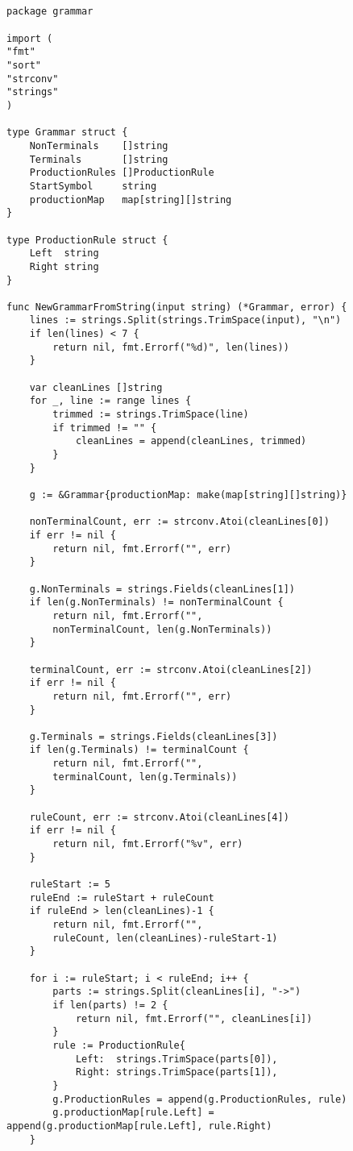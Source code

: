 \begin{appendices}
	\chapter{}\label{app1}
	\begin{lstlisting}[caption=Модуль grammar, extendedchars=\true]
package grammar

import (
"fmt"
"sort"
"strconv"
"strings"
)

type Grammar struct {
	NonTerminals    []string
	Terminals       []string
	ProductionRules []ProductionRule
	StartSymbol     string
	productionMap   map[string][]string
}

type ProductionRule struct {
	Left  string
	Right string
}

func NewGrammarFromString(input string) (*Grammar, error) {
	lines := strings.Split(strings.TrimSpace(input), "\n")
	if len(lines) < 7 {
		return nil, fmt.Errorf("%d)", len(lines))
	}
	
	var cleanLines []string
	for _, line := range lines {
		trimmed := strings.TrimSpace(line)
		if trimmed != "" {
			cleanLines = append(cleanLines, trimmed)
		}
	}
	
	g := &Grammar{productionMap: make(map[string][]string)}
	
	nonTerminalCount, err := strconv.Atoi(cleanLines[0])
	if err != nil {
		return nil, fmt.Errorf("", err)
	}
	
	g.NonTerminals = strings.Fields(cleanLines[1])
	if len(g.NonTerminals) != nonTerminalCount {
		return nil, fmt.Errorf("",
		nonTerminalCount, len(g.NonTerminals))
	}
	
	terminalCount, err := strconv.Atoi(cleanLines[2])
	if err != nil {
		return nil, fmt.Errorf("", err)
	}
	
	g.Terminals = strings.Fields(cleanLines[3])
	if len(g.Terminals) != terminalCount {
		return nil, fmt.Errorf("",
		terminalCount, len(g.Terminals))
	}
	
	ruleCount, err := strconv.Atoi(cleanLines[4])
	if err != nil {
		return nil, fmt.Errorf("%v", err)
	}
	
	ruleStart := 5
	ruleEnd := ruleStart + ruleCount
	if ruleEnd > len(cleanLines)-1 {
		return nil, fmt.Errorf("",
		ruleCount, len(cleanLines)-ruleStart-1)
	}
	
	for i := ruleStart; i < ruleEnd; i++ {
		parts := strings.Split(cleanLines[i], "->")
		if len(parts) != 2 {
			return nil, fmt.Errorf("", cleanLines[i])
		}
		rule := ProductionRule{
			Left:  strings.TrimSpace(parts[0]),
			Right: strings.TrimSpace(parts[1]),
		}
		g.ProductionRules = append(g.ProductionRules, rule)
		g.productionMap[rule.Left] = append(g.productionMap[rule.Left], rule.Right)
	}
	

\end{lstlisting}
\end{appendices}
